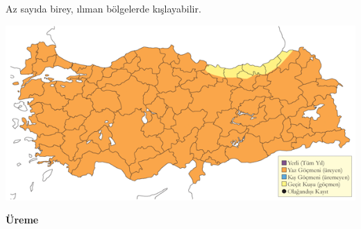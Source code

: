 \documentclass[
  a4paper,
  DIV=11,
  numbers=noendperiod]{scrreprt}
\begin{document}
Az sayıda birey, ılıman bölgelerde kışlayabilir.

\includegraphics{images/harita_Page_060.png}

\textbf{Üreme}
\end{document}
